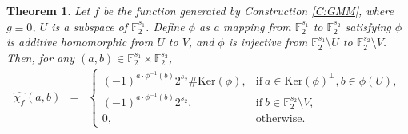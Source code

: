 \documentclass[10pt]{article}
\newtheorem{theorem}{Theorem}
\newcommand{\F}{\mathbb{F}}
\newcommand{\0}{\textbf{0}}
\newcommand{\1}{\textbf{1}}
\newcommand{\W}[2][]{\widehat{\chi_{#2}}^{#1}}
\begin{document}
\begin{theorem}\label{thm:GMM-wf}
Let $f$ be the function generated by Construction \ref{C:GMM}, where $g\equiv 0$,
$U$ is a subspace of $\F_2^{s_1}$.
Define $\phi$ as a mapping from $\F_2^{s_1}$ to $\F_2^{s_2}$ satisfying
$\phi$ is additive homomorphic from $U$ to $V$, and $\phi$ is injective from $\F_2^{s_1}\setminus U$ to $\F_2^{s_2}\setminus V$.
Then, for any $(a,b)\in\F_2^{s_1}\times\F_2^{s_2}$,
\begin{eqnarray}
\W f(a,b)
&=& \left\{
\begin{array}{llllll}
(-1)^{a\cdot \phi^{-1}(b)} 2^{s_2} \#\mathrm{Ker}(\phi), & \mbox{if}~a\in \mathrm{Ker}(\phi)^{\bot}, b\in\phi(U),\\
(-1)^{a\cdot \phi^{-1}(b)} 2^{s_2},&\mbox{if}~ b\in\F_2^{s_2}\setminus V,\\
0,& \mbox{otherwise}.
\end{array}
\right.
\end{eqnarray}
\end{theorem}
\end{document}
